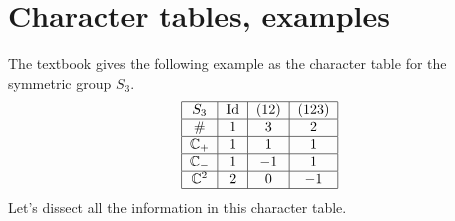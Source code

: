 \documentclass[oneside]{scrbook}
\newcommand{\Id}{\text{Id}}
\begin{document}
\section{Character tables, examples}
The textbook gives the following example as the character table for the symmetric group $S_3$. 
\[\begin{tabular}{|c|c|c|c|}
\hline
    $S_3$ & $\Id$ & $(12)$ & $(123)$ \\
    \hline
    \# & 1 & 3 & 2\\
    \hline
    $\CC_+$ & 1 & 1 & 1\\
    \hline
    $\CC_-$ & 1 & $-1$ & 1\\
    \hline
    $\CC^2$ & 2 & 0 & $-1$\\
    \hline
\end{tabular}\]
Let's dissect all the information in this character table.
\end{document}
